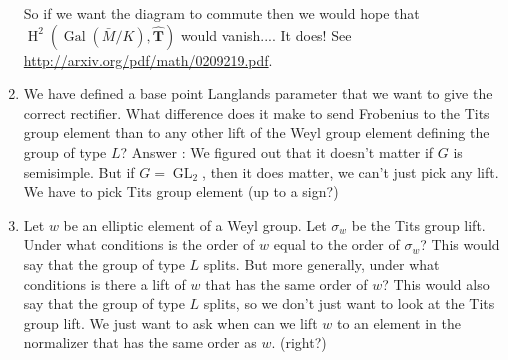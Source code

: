 \documentclass{article}
\DeclareMathOperator{\HH}{H}
\DeclareMathOperator{\Hom}{Hom}
\DeclareMathOperator{\Gal}{Gal}
\DeclareMathOperator{\GL}{GL}
\newcommand{\HT}[1]{\widehat{\HH}^{#1}}
\newcommand{\T}{\mathbf{T}}
\newcommand{\Th}{\hat{\T}}
\newcommand{\CC}{\mathbb{C}}
\begin{document}
\begin{enumerate}
So if we want the diagram to commute then we would hope that $\HH^2(\Gal(\bar{M}/K), \Th)$ would vanish....   It does!  See \url{http://arxiv.org/pdf/math/0209219.pdf}.



\item We have defined a base point Langlands parameter that we want to give the correct rectifier.  What difference does it make to send Frobenius to the Tits group element than to any other lift of the Weyl group element defining the group of type $L$?  Answer : We figured out that it doesn't matter if $G$ is semisimple.  But if $G = \GL_2$, then it does matter, we can't just pick any lift.  We have to pick Tits group element (up to a sign?)

\item Let $w$ be an elliptic element of a Weyl group.  Let $\sigma_w$ be the Tits group lift.  Under what conditions is the order of $w$ equal to the order of $\sigma_w$?  This would say that the group of type $L$ splits.  But more generally, under what conditions is there a lift of $w$ that has the same order of $w$?  This would also say that the group of type $L$ splits, so we don't just want to look at the Tits group lift.  We just want to ask when can we lift $w$ to an element in the normalizer that has the same order as $w$. (right?)


\end{enumerate}
\end{document}
